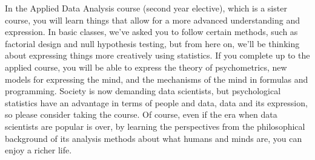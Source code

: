 \documentclass{ltjbook}
\begin{document}
In the Applied Data Analysis course (second year elective), which is a sister course, you will learn things that allow for a more advanced understanding and expression. In basic classes, we've asked you to follow certain methods, such as factorial design and null hypothesis testing, but from here on, we'll be thinking about expressing things more creatively using statistics. If you complete up to the applied course, you will be able to express the theory of psychometrics, new models for expressing the mind, and the mechanisms of the mind in formulas and programming. Society is now demanding data scientists, but psychological statistics have an advantage in terms of people and data, data and its expression, so please consider taking the course. Of course, even if the era when data scientists are popular is over, by learning the perspectives from the philosophical background of its analysis methods about what humans and minds are, you can enjoy a richer life.
\end{document}
